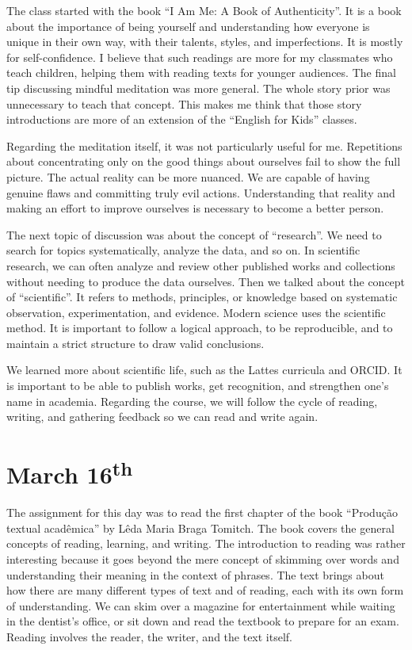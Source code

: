 The class started with the book ``I Am Me: A Book of Authenticity''. It is a book about the importance of being yourself and understanding how everyone is unique in their own way, with their talents, styles, and imperfections. It is mostly for self-confidence. I believe that such readings are more for my classmates who teach children, helping them with reading texts for younger audiences. The final tip discussing mindful meditation was more general. The whole story prior was unnecessary to teach that concept. This makes me think that those story introductions are more of an extension of the ``English for Kids'' classes.

Regarding the meditation itself, it was not particularly useful for me. Repetitions about concentrating only on the good things about ourselves fail to show the full picture. The actual reality can be more nuanced. We are capable of having genuine flaws and committing truly evil actions. Understanding that reality and making an effort to improve ourselves is necessary to become a better person.

The next topic of discussion was about the concept of ``research''. We need to search for topics systematically, analyze the data, and so on. In scientific research, we can often analyze and review other published works and collections without needing to produce the data ourselves. Then we talked about the concept of ``scientific''. It refers to methods, principles, or knowledge based on systematic observation, experimentation, and evidence. Modern science uses the scientific method. It is important to follow a logical approach, to be reproducible, and to maintain a strict structure to draw valid conclusions.

We learned more about scientific life, such as the Lattes curricula and ORCID. It is important to be able to publish works, get recognition, and strengthen one's name in academia. Regarding the course, we will follow the cycle of reading, writing, and gathering feedback so we can read and write again.

\section[March 16th]{March 16\textsuperscript{th}}

The assignment for this day was to read the first chapter of the book ``Produção textual acadêmica'' by Lêda Maria Braga Tomitch. The book covers the general concepts of reading, learning, and writing. The introduction to reading was rather interesting because it goes beyond the mere concept of skimming over words and understanding their meaning in the context of phrases. The text brings about how there are many different types of text and of reading, each with its own form of understanding. We can skim over a magazine for entertainment while waiting in the dentist's office, or sit down and read the textbook to prepare for an exam. Reading involves the reader, the writer, and the text itself.

